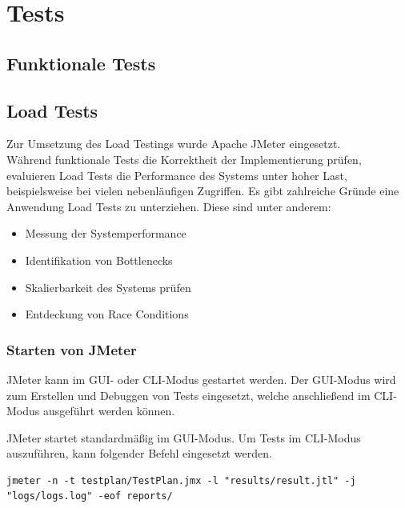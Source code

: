 \chapter{Tests}

\section{Funktionale Tests}\label{sec:tests-functional}



\clearpage
\section{Load Tests}\label{sec:tests-load}
Zur Umsetzung des Load Testings wurde Apache JMeter eingesetzt.\\

Während funktionale Tests die Korrektheit der Implementierung prüfen,
evaluieren Load Tests die Performance des Systems unter hoher Last,
beispielsweise bei vielen nebenläufigen Zugriffen.
Es gibt zahlreiche Gründe eine Anwendung Load Tests zu unterziehen.
Diese sind unter anderem:

\begin{itemize}
    \item Messung der Systemperformance
    \item Identifikation von Bottlenecks
    \item Skalierbarkeit des Systems prüfen
    \item Entdeckung von Race Conditions
\end{itemize}

\subsection{Starten von JMeter}

JMeter kann im GUI- oder CLI-Modus gestartet werden.
Der GUI-Modus wird zum Erstellen und Debuggen von Tests eingesetzt,
welche anschließend im CLI-Modus ausgeführt werden können.

JMeter startet standardmäßig im GUI-Modus.
Um Tests im CLI-Modus auszuführen, kann folgender Befehl eingesetzt werden.

\begin{lstlisting}[caption=Beispielkonfiguration des CLI-Modus]
    jmeter -n -t testplan/TestPlan.jmx -l "results/result.jtl" -j "logs/logs.log" -eof reports/
\end{lstlisting}


